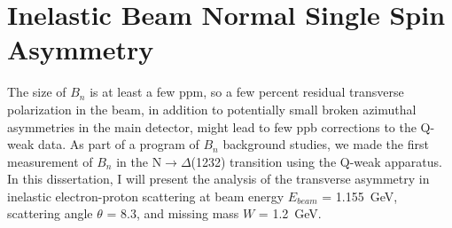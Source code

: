 \section{Inelastic Beam Normal Single Spin Asymmetry}%
\label{Inelastic Beam Normal Single Spin Asymmetry}

%

The size of $B_{n}$ is at least a few ppm, so a few percent residual transverse polarization in the beam, in addition to potentially small broken azimuthal asymmetries in the main detector, might lead to few ppb corrections to the Q-weak data. 
As part of a program of $B_{n}$ background studies, we made the first measurement of $B_{n}$ in the N$\rightarrow\Delta$(1232) transition using the Q-weak apparatus. 
In this dissertation, I will present the analysis of the transverse asymmetry in inelastic electron-proton scattering at beam energy $E_{beam}$ = 1.155~GeV, scattering angle $\theta$ = 8.3\degrees{}, and missing mass $W$ = 1.2~GeV.

